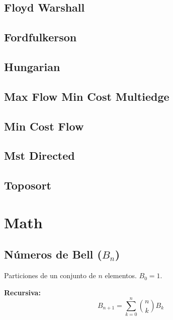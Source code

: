 \documentclass[9pt,portrait,twocolumn,a4paper,notitlepage]{article}
\newcommand\cppfile[2][]{%
\ifstrempty{#1}{}{}%
}
\begin{document}
\subsection{Floyd Warshall}
\cppfile{grafos_clean/floyd_warshall.cpp}

\subsection{Fordfulkerson}
\cppfile{grafos_clean/FordFulkerson.cpp}

\subsection{Hungarian}
\cppfile{grafos_clean/hungarian.cpp}

\subsection{Max Flow Min Cost Multiedge}
\cppfile{grafos_clean/max_flow_min_cost_multiedge.cpp}

\subsection{Min Cost Flow}
\cppfile{grafos_clean/min_cost_flow.cpp}

\subsection{Mst Directed}
\cppfile{grafos_clean/MST_Directed.cpp}

\subsection{Toposort}
\cppfile{grafos_clean/toposort.cpp}


\section{Math}

\subsection*{Números de Bell ($B_n$)}
Particiones de un conjunto de $n$ elementos. $B_0=1$.

\textbf{Recursiva:}
$$ B_{n+1} = \sum_{k=0}^{n} \binom{n}{k} B_k $$
\end{document}
